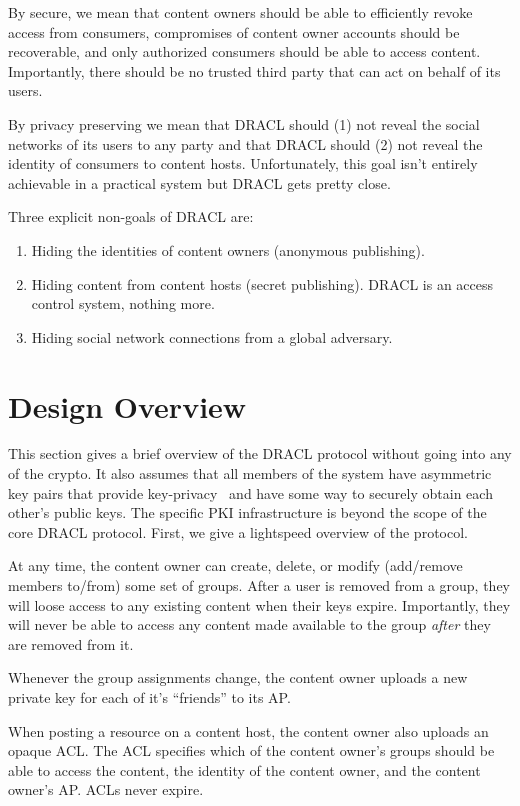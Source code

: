 \documentclass[pdftex,12pt,a4papaer]{report}
\begin{document}
By secure, we mean that content owners should be able to efficiently revoke
access from consumers, compromises of content owner accounts should be
recoverable, and only authorized consumers should be able to access content.
Importantly, there should be no trusted third party that can act on behalf of
its users.

By privacy preserving we mean that DRACL should (1) not reveal the social
networks of its users to any party and that DRACL should (2) not reveal the
identity of consumers to content hosts. Unfortunately, this goal isn't entirely
achievable in a practical system but DRACL gets pretty close.

Three explicit non-goals of DRACL are:

\begin{enumerate}
\item Hiding the identities of content owners (anonymous publishing).
\item Hiding content from content hosts (secret publishing). DRACL is an access
control system, nothing more.
\item Hiding social network connections from a global adversary.
\end{enumerate}

\section{Design Overview}

This section gives a brief overview of the DRACL protocol without going into any
of the crypto. It also assumes that all members of the system have asymmetric
key pairs that provide key-privacy~\cite{keyprivacy} and have some way to
securely obtain each other's public keys. The specific PKI infrastructure is
beyond the scope of the core DRACL protocol. First, we give a lightspeed
overview of the protocol.

At any time, the content owner can create, delete, or modify (add/remove members
to/from) some set of groups. After a user is removed from a group, they will
loose access to any existing content when their keys expire. Importantly, they
will never be able to access any content made available to the group
\emph{after} they are removed from it.
  
Whenever the group assignments change, the content owner uploads a new private
key for each of it's ``friends'' to its AP.
  
When posting a resource on a content host, the content owner also uploads an
opaque ACL. The ACL specifies which of the content owner's groups should be able
to access the content, the identity of the content owner, and the content
owner's AP. ACLs never expire.
  
\end{document}
